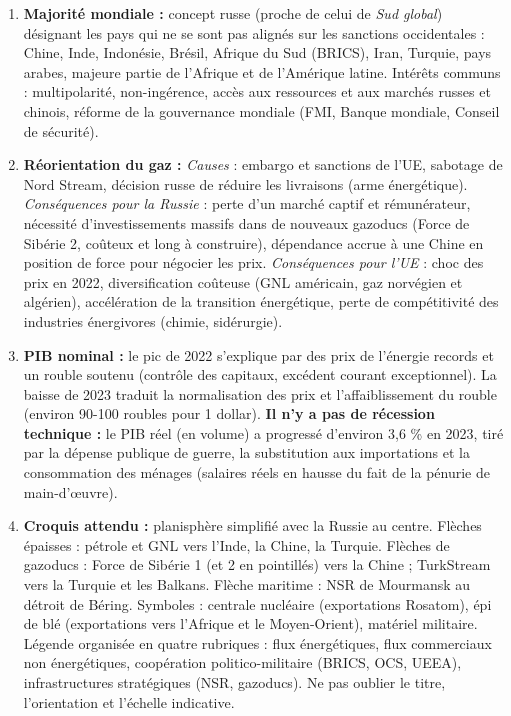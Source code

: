 \documentclass[11pt]{article}
\begin{document}
\begin{corrige}
\begin{enumerate}
    \item \textbf{Majorité mondiale :} concept russe (proche de celui de \emph{Sud global}) désignant les pays qui ne se sont pas alignés sur les sanctions occidentales : Chine, Inde, Indonésie, Brésil, Afrique du Sud (BRICS), Iran, Turquie, pays arabes, majeure partie de l'Afrique et de l'Amérique latine. Intérêts communs : multipolarité, non-ingérence, accès aux ressources et aux marchés russes et chinois, réforme de la gouvernance mondiale (FMI, Banque mondiale, Conseil de sécurité).
    \item \textbf{Réorientation du gaz :} \emph{Causes} : embargo et sanctions de l'UE, sabotage de Nord Stream, décision russe de réduire les livraisons (arme énergétique). \emph{Conséquences pour la Russie} : perte d'un marché captif et rémunérateur, nécessité d'investissements massifs dans de nouveaux gazoducs (Force de Sibérie 2, coûteux et long à construire), dépendance accrue à une Chine en position de force pour négocier les prix. \emph{Conséquences pour l'UE} : choc des prix en 2022, diversification coûteuse (GNL américain, gaz norvégien et algérien), accélération de la transition énergétique, perte de compétitivité des industries énergivores (chimie, sidérurgie).
    \item \textbf{PIB nominal :} le pic de 2022 s'explique par des prix de l'énergie records et un rouble soutenu (contrôle des capitaux, excédent courant exceptionnel). La baisse de 2023 traduit la normalisation des prix et l'affaiblissement du rouble (environ 90-100 roubles pour 1 dollar). \textbf{Il n'y a pas de récession technique :} le PIB réel (en volume) a progressé d'environ 3,6 \% en 2023, tiré par la dépense publique de guerre, la substitution aux importations et la consommation des ménages (salaires réels en hausse du fait de la pénurie de main-d'œuvre).
    \item \textbf{Croquis attendu :} planisphère simplifié avec la Russie au centre. Flèches épaisses : pétrole et GNL vers l'Inde, la Chine, la Turquie. Flèches de gazoducs : Force de Sibérie 1 (et 2 en pointillés) vers la Chine ; TurkStream vers la Turquie et les Balkans. Flèche maritime : NSR de Mourmansk au détroit de Béring. Symboles : centrale nucléaire (exportations Rosatom), épi de blé (exportations vers l'Afrique et le Moyen-Orient), matériel militaire. Légende organisée en quatre rubriques : flux énergétiques, flux commerciaux non énergétiques, coopération politico-militaire (BRICS, OCS, UEEA), infrastructures stratégiques (NSR, gazoducs). Ne pas oublier le titre, l'orientation et l'échelle indicative.
\end{enumerate}
\end{corrige}
\end{document}
